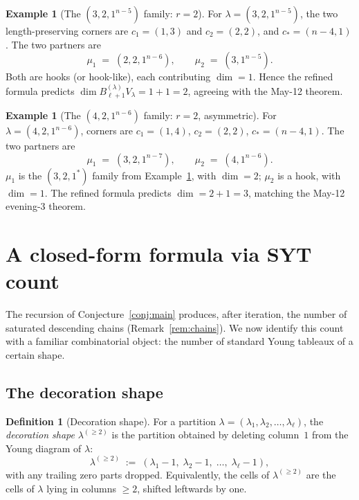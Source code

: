 \documentclass[11pt]{article}
\theoremstyle{definition}
\newtheorem{definition}[theorem]{Definition}
\newtheorem{example}[theorem]{Example}
\begin{document}
\begin{example}[The $(3, 2, 1^{n-5})$ family: $r = 2$]\label{ex:321}
For $\lambda = (3, 2, 1^{n-5})$, the two length-preserving corners are
$c_1 = (1, 3)$ and $c_2 = (2, 2)$, and $c_* = (n-4, 1)$. The two
partners are
\[
   \mu_1 \;=\; (2, 2, 1^{n-6}),\qquad
   \mu_2 \;=\; (3, 1^{n-5}).
\]
Both are hooks (or hook-like), each contributing $\dim = 1$. Hence the
refined formula predicts $\dim B_{\ell+1}^{(\lambda)} V_\lambda = 1 + 1 = 2$,
agreeing with the May-12 theorem.
\end{example}

\begin{example}[The $(4, 2, 1^{n-6})$ family: $r = 2$, asymmetric]\label{ex:421}
For $\lambda = (4, 2, 1^{n-6})$, corners are $c_1 = (1, 4)$,
$c_2 = (2, 2)$, $c_* = (n-4, 1)$. The two partners are
\[
   \mu_1 \;=\; (3, 2, 1^{n-7}),\qquad
   \mu_2 \;=\; (4, 1^{n-6}).
\]
$\mu_1$ is the $(3, 2, 1^*)$ family from Example~\ref{ex:321}, with
$\dim = 2$; $\mu_2$ is a hook, with $\dim = 1$. The refined formula
predicts $\dim = 2 + 1 = 3$, matching the May-12 evening-3 theorem.
\end{example}

\section{A closed-form formula via SYT count}\label{sec:syt}

The recursion of Conjecture~\ref{conj:main} produces, after iteration,
the number of saturated descending chains (Remark~\ref{rem:chains}). We
now identify this count with a familiar combinatorial object: the
number of standard Young tableaux of a certain shape.

\subsection{The decoration shape}

\begin{definition}[Decoration shape]\label{def:decoration}
For a partition $\lambda = (\lambda_1, \lambda_2, \ldots, \lambda_\ell)$,
the \emph{decoration shape} $\lambda^{(\ge 2)}$ is the partition obtained
by deleting column~$1$ from the Young diagram of $\lambda$:
\[
   \lambda^{(\ge 2)} \;:=\; (\lambda_1 - 1,\; \lambda_2 - 1,\; \ldots,\; \lambda_\ell - 1),
\]
with any trailing zero parts dropped. Equivalently, the cells of
$\lambda^{(\ge 2)}$ are the cells of $\lambda$ lying in columns $\ge 2$,
shifted leftwards by one.
\end{definition}
\end{document}
